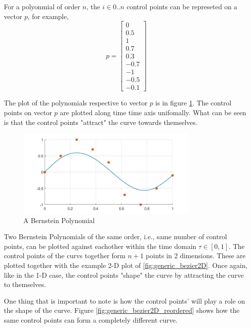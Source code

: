 \par For a polyonmial of order $n$, the $i \in {0 .. n}$ control points can be represeted on a vector $p$, for example,
\begin{equation}
    p = \begin{bmatrix}0\\ 0.5\\ 1\\ 0.7\\ 0.3\\ -0.7\\ -1\\ -0.5\\ -0.1\end{bmatrix}
\end{equation}
\par The plot of the polynomials respective to vector $p$ is in figure \ref{fig:generic_bezier}. The control points on vector $p$ are plotted along time time axis unifomally. What can be seen is that the control points "attract" the curve towards themselves.

\begin{figure}[h!]
\centering
\includegraphics[width=0.8\textwidth]{Images/generic_bezier.jpg}
\caption{A Bernstein Polynomial}
\label{fig:generic_bezier}
\end{figure}


\par Two Bernstein Polynomials of the same order, i.e., same number of control points, can be plotted against eachother within the time domain $\tau \in [0,1]$. The control points of the curvs together form $n+1$ points in 2 dimensions. These are plotted together with the example 2-D plot of \ref{fig:generic_bezier2D}. Once again, like in the 1-D case, the control points "shape" the curve by attracting the curve to themselves.
\par One thing that is important to note is how the control points'  will play a role on the shape of the curve. Figure \ref{fig:generic_bezier2D_reordered} shows how the same control points can form a completely different curve.

